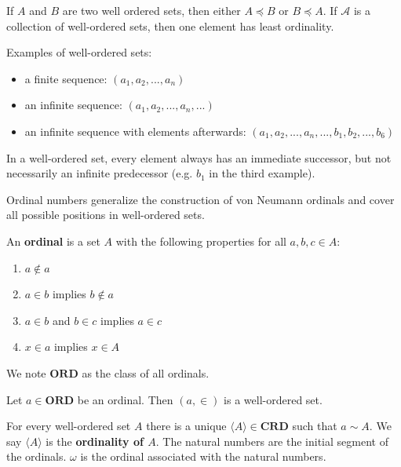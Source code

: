 \documentclass{article}
\newcommand{\marginleft}[1] {\reversemarginpar\marginpar{#1}}
\def\ordinals{\textbf{ORD}}
\def\cardinals{\textbf{CRD}}
\def\ordleq{\preceq}
\def\ordeq{\sim}
\begin{document}
\begin{prop}[Ordinality]
	If $A$ and $B$ are two well ordered sets, then either $A \ordleq B$ or $B \ordleq A$. If $\mathcal{A}$ is a collection of well-ordered sets, then one element has least ordinality.
\end{prop}

\begin{remark}
	Examples of well-ordered sets:
	\begin{itemize}
		\item a finite sequence: $(a_1, a_2, ..., a_n)$
		\item an infinite sequence: $(a_1, a_2, ..., a_n, ...)$
		\item an infinite sequence with elements afterwards: $(a_1, a_2, ..., a_n, ..., b_1, b_2, ... , b_6)$
	\end{itemize}
	In a well-ordered set, every element always has an immediate successor, but not necessarily an infinite predecessor (e.g. $b_1$ in the third example). 
\end{remark}

\begin{remark}
	Ordinal numbers generalize the construction of von Neumann ordinals and cover all possible positions in well-ordered sets.
\end{remark}

\begin{defn}[Ordinals]
	An \textbf{ordinal} \marginleft{Ordinals: \ordinals} is a set $A$ with the following properties for all $a, b, c \in A$:
	\begin{enumerate}
		\item $a \notin a$
		\item $a \in b$ implies $b \notin a$
		\item $a \in b$ and $b \in c$ implies $a \in c$
		\item $x \in a$ implies $x \in A$
	\end{enumerate}
	We note $\ordinals$ as the class of all ordinals.
\end{defn}

\begin{prop}
	Let $a \in \ordinals$ be an ordinal. Then $(a, \in)$ is a well-ordered set.
\end{prop}

\begin{prop}
	For every \marginleft{$\langle A \rangle$} well-ordered set $A$ there is a unique $\langle A \rangle \in \cardinals$ such that $a \ordeq A$. We say $\langle A \rangle$ is the \textbf{ordinality of $A$}. The natural numbers are the initial segment of the ordinals. $\omega$ is the ordinal associated with the natural numbers.
\end{prop}
\end{document}
